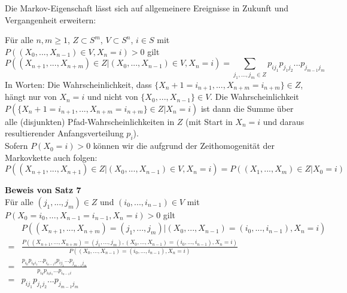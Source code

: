 \documentclass[a4paper,12pt]{article}
\begin{document}
Die Markov-Eigenschaft lässt sich auf allgemeinere Ereignisse in Zukunft und Vergangenheit erweitern: \\

\begin{tcolorbox}[breakable, colframe=green, colback=white, title=Satz 7]
	Für alle $n, m \geq 1$, $Z \subset S^m$, $V \subset S^n$, $i \in S$ mit $P((X_0, ..., X_{n-1})\in V,X_n = i) > 0$ gilt
	$$
		P((X_{n+1}, ..., X_{n+m})\in Z | (X_0, ..., X_{n-1}) \in V, X_n = i) = \sum_{j_1, ..., j_m \in Z} p_{ij_1}p_{j_1j_2}...p_{j_{m-1}j_m}
	$$
	In Worten: Die Wahrscheinlichkeit, dass $\{X_n+1 = i_{n+1}, ..., X_{n+m}=i_{n+m}\} \in Z$, hängt nur von $X_n = i$ und nicht von
	$\{X_0, ..., X_{n-1}\} \in V$. Die Wahrscheinlichkeit $P(\{X_n+1 = i_{n+1}, ..., X_{n+m}=i_{n+m}\} \in Z | X_n = i)$ ist dann die Summe
	über alle (disjunkten) Pfad-Wahrscheinlichkeiten in $Z$ (mit Start in $X_n = i$ und daraus resultierender Anfangsverteilung $p_i$).\\
	Sofern $P(X_0 = i) > 0$ können wir die aufgrund der Zeithomogenität der Markovkette auch folgen:
	$$
		P((X_{n+1}, ..., X_{n+1})\in Z | (X_0, ..., X_{n-1})\in V, X_n = i) = P((X_1, ..., X_m)\in Z | X_0 = i)
	$$
\end{tcolorbox}

\textbf{Beweis von Satz 7}\\
Für alle $(j_1, ..., j_m) \in Z$ und $(i_0, ..., i_{n-1}) \in V$ mit
$P(X_0 = i_0, ..., X_{n-1}=i_{n-1}, X_n = i) > 0$ gilt
\begin{align*}
	  & P((X_{n+1}, ..., X_{n+m}) = (j_1, ..., j_m) | (X_0, ..., X_{n-1}) = (i_0, ..., i_{n-1}), X_n = i)                                                              \\
	= & \frac{P((X_{n+1}, ..., X_{n+m}) = (j_1, ..., j_m), (X_0, ..., X_{n-1}) = (i_0, ..., i_{n-1}), X_n = i)}{P((X_0, ..., X_{n-1}) = (i_0, ..., i_{n-1}), X_n = i)} \\
	= & \frac{p_{i_0}p_{i_0i_1}...p_{i_{n-1}i}p_{ij_1}...p_{j_{m-1}j_m}}{p_{i_0}p_{i_0i_1}...p_{i_{n-1}i}}                                                             \\
	= & p_{ij_1}p_{j_1j_2}...p_{j_{m-1}j_m}
\end{align*}
\end{document}
